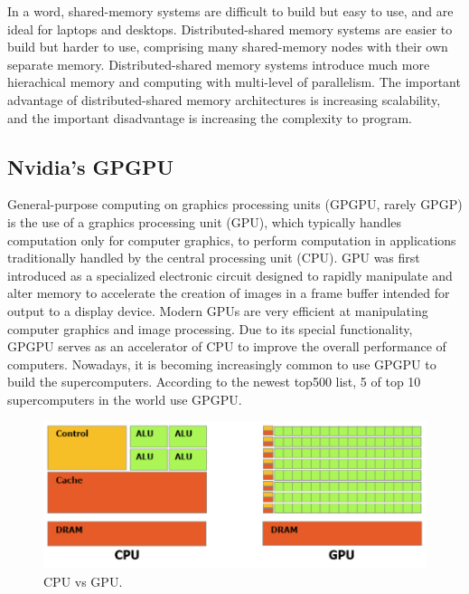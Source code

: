 In a word, shared-memory systems are difficult to build but easy to use, and are ideal for laptops and desktops. Distributed-shared memory systems are easier to build but harder to use, comprising many shared-memory nodes with their own separate memory. Distributed-shared memory systems introduce much more hierachical memory and computing with multi-level of parallelism. The important advantage of distributed-shared memory architectures is increasing scalability, and the important disadvantage is increasing the complexity to program.

\subsection{Nvidia's GPGPU}

General-purpose computing on graphics processing units (GPGPU, rarely GPGP) is the use of a graphics processing unit (GPU), which typically handles computation only for computer graphics, to perform computation in applications traditionally handled by the central processing unit (CPU). GPU was first introduced as a specialized electronic circuit designed to rapidly manipulate and alter memory to accelerate the creation of images in a frame buffer intended for output to a display device. Modern GPUs are very efficient at manipulating computer graphics and image processing. Due to its special functionality, GPGPU serves as an accelerator of CPU to improve the overall performance of computers. Nowadays, it is becoming increasingly common to use GPGPU to build the supercomputers. According to the newest top500 list, 5 of top 10 supercomputers in the world use GPGPU.

\begin{figure}[htbp]
	\centering
	\includegraphics[width=6.3in]{fig/cpu_vs_gpu.png}
	\caption{CPU vs GPU.}
	\label{cpuvsgpu}
\end{figure}

